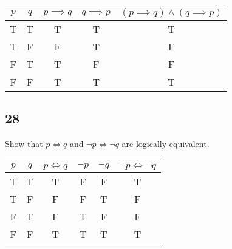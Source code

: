 \documentclass{article}
\begin{document}
\begin{tabular}{ | c | c | c | c | c | }
	$ p $ & $ q $ & $ p \implies q $ & $ q \implies p $ & $ ( p \implies q ) \land ( q \implies p ) $ \\
	\hline
	T & T & T & T & T \\
	T & F & F & T & F \\
	F & T & T & F & F \\
	F & F & T & T & T \\
\end{tabular}

\subsection{28}

Show that $ p \iff q $ and $ \neg p \iff \neg q $ are logically equivalent.

\begin{tabular}{ | c | c | c | c | c | c | }
	$ p $ & $ q $ & $ p \iff q $ & $ \neg p $ & $ \neg q $ & $ \neg p \iff \neg q $ \\
	\hline
	T & T & T & F & F & T \\
	T & F & F & F & T & F \\
	F & T & F & T & F & F \\
	F & F & T & T & T & T \\
\end{tabular}
\end{document}
